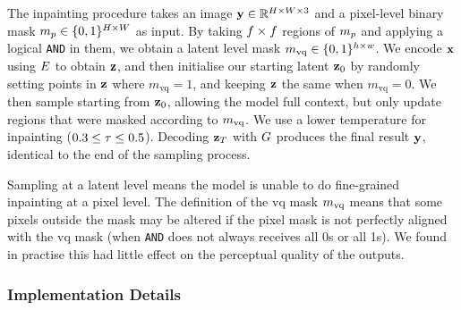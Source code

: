 The inpainting procedure takes an image $\mathbf{y} \in \mathbb{R}^{H \times W \times 3}$
and a pixel-level binary mask $m_p \in \{0, 1\}^{H \times W}$ as input.
By taking $f \times f$ regions of $m_p$ and
applying a logical \texttt{AND} in them, we obtain a latent level mask $m_\textrm{vq}
\in \{0,1\}^{h \times w}$. We encode $\mathbf{x}$ using $E$ to obtain
$\mathbf{z}$, and then initialise our starting latent $\mathbf{z}_0$ by randomly
setting points in $\mathbf{z}$ where $m_\text{vq} = 1$, and keeping $\mathbf{z}$ the
same when $m_\text{vq} = 0$. We then sample starting from $\mathbf{z}_0$, allowing
the model full context, but only update regions that were masked according to
$m_\textrm{vq}$. We use a lower temperature for inpainting ($0.3 \leq \tau
\leq 0.5$). Decoding $\mathbf{z}_T$ with $G$ produces the final result
$\mathbf{y}$, identical to the end of the sampling process.

Sampling at a latent level means the model is unable to do fine-grained
inpainting at a pixel level. The definition of the \gls{vq} mask $m_\textrm{vq}$ means
that some pixels outside the mask may be altered if the pixel mask is not
perfectly aligned with the \gls{vq} mask (when \texttt{AND} does not always
receives all 0s or all 1s). We found in practise this had little effect on the
perceptual quality of the outputs.

\subsubsection*{Implementation Details}

